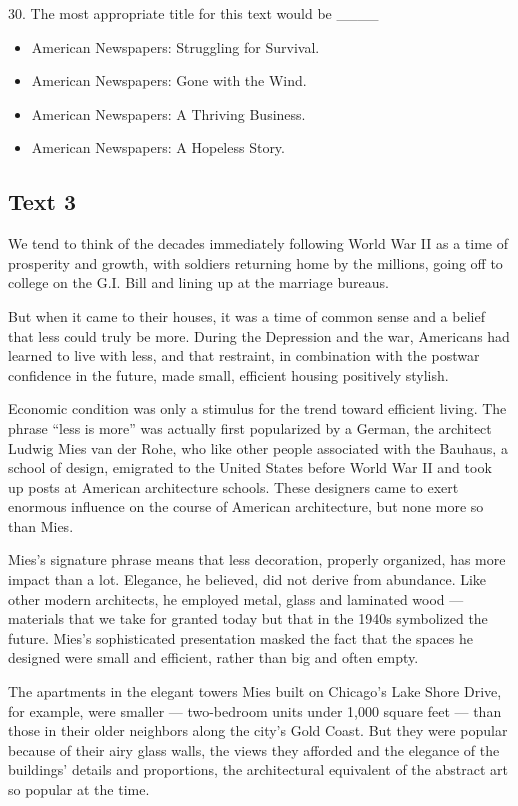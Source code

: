 \documentclass[UTF8,11pt]{ctexart}
\begin{document}
30. The most appropriate title for this text would be \_\_\_\_


\begin{itemize}[leftmargin=2em,itemsep=.2em,topsep=.4em]\item[A.] American Newspapers: Struggling for Survival.
\item[B.] American Newspapers: Gone with the Wind.
\item[C.] American Newspapers: A Thriving Business.
\item[D.] American Newspapers: A Hopeless Story.
\end{itemize}

\subsection*{\textbf{Text 3}}


We tend to think of the decades immediately following World War II as a time of prosperity and growth, with soldiers returning home by the millions, going off to college on the G.I. Bill and lining up at the marriage bureaus.


But when it came to their houses, it was a time of common sense and a belief that less could truly be more. During the Depression and the war, Americans had learned to live with less, and that restraint, in combination with the postwar confidence in the future, made small, efficient housing positively stylish.


Economic condition was only a stimulus for the trend toward efficient living. The phrase “less is more” was actually first popularized by a German, the architect Ludwig Mies van der Rohe, who like other people associated with the Bauhaus, a school of design, emigrated to the United States before World War II and took up posts at American architecture schools. These designers came to exert enormous influence on the course of American architecture, but none more so than Mies.


Mies’s signature phrase means that less decoration, properly organized, has more impact than a lot. Elegance, he believed, did not derive from abundance. Like other modern architects, he employed metal, glass and laminated wood — materials that we take for granted today but that in the 1940s symbolized the future. Mies’s sophisticated presentation masked the fact that the spaces he designed were small and efficient, rather than big and often empty.


The apartments in the elegant towers Mies built on Chicago’s Lake Shore Drive, for example, were smaller — two-bedroom units under 1,000 square feet — than those in their older neighbors along the city’s Gold Coast. But they were popular because of their airy glass walls, the views they afforded and the elegance of the buildings’ details and proportions, the architectural equivalent of the abstract art so popular at the time.
\end{document}
